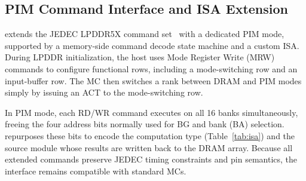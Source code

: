 


\subsection{PIM Command Interface and ISA Extension}
\label{sec:architecture-c}

\sys{} extends the JEDEC LPDDR5X command set~\cite{jedec_lpddr5} with a dedicated PIM mode, supported by a memory-side command decode state machine and a custom ISA. During LPDDR initialization, the host uses Mode Register Write (MRW) commands to configure functional rows, including a mode-switching row and an input-buffer row. The MC then switches a rank between DRAM and PIM modes simply by issuing an ACT to the mode-switching row.

In PIM mode, each RD/WR command executes on all 16 banks simultaneously, freeing the four address bits normally used for BG and bank (BA) selection. \sys{} repurposes these bits to encode the computation type (Table~\ref{tab:isa}) and the source module whose results are written back to the DRAM array. Because all extended commands preserve JEDEC timing constraints and pin semantics, the interface remains compatible with standard MCs.